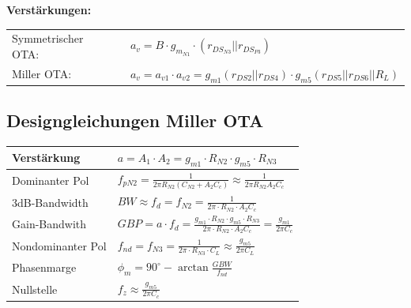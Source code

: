 \textbf{Verstärkungen:} \\
\begin{tabular}{lll}
	Symmetrischer OTA:	& & $a_v = B \cdot g_{m_{N1}} \cdot (r_{DS_{N3}} || r_{DS_{P3}})$ \\
	Miller OTA:			& & $a_v = a_{v1} \cdot a_{v2} = g_{m1}(r_{DS2} || r_{DS4}) \cdot g_{m5}(r_{DS5} || r_{DS6} || R_L)$
\end{tabular}

\subsection{Designgleichungen Miller OTA}
\begin{tabular}{|l|l|} \hline
	Verstärkung & $a = A_1 \cdot A_2 = g_{m1} \cdot R_{N2} \cdot g_{m5} \cdot R_{N3}$ \\ \hline
	Dominanter Pol & $f_{pN2} = \frac{1}{2\pi R_{N2} (C_{N2}+A_2C_c)} \approx \frac{1}{2\pi R_{N2}A_2C_c}$ \\ \hline
	3dB-Bandwidth & $BW \approx f_d = f_{N2} = \frac{1}{2\pi \cdot R_{N2} \cdot A_2C_c}$ \\ \hline
	Gain-Bandwith & $GBP = a \cdot f_d = \frac{g_{m1} \cdot R_{N2} \cdot g_{m5} \cdot R_{N3}}{2\pi \cdot R_{N2} \cdot A_2C_c} = \frac{g_{m1}}{2\pi C_c}$ \\ \hline
	Nondominanter Pol & $f_{nd} = f_{N3} = \frac{1}{2\pi \cdot R_{N3} \cdot C_L} \approx \frac{g_{m5}}{2\pi C_L}$ \\ \hline
	Phasenmarge & $\phi_m = 90^\circ - \arctan \frac{GBW}{f_{nd}}$ \\ \hline
	Nullstelle & $f_z \approx \frac{g_{m5}}{2\pi C_c}$ \\ \hline
\end{tabular}